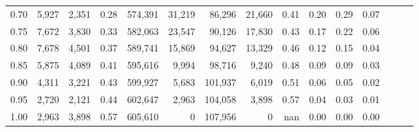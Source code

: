 \begin{tabular}{rrrrrrrrrrrrrrr}
0.70 &    5,927 &   2,351 &  0.28 &  574,391 &   31,219 &   86,296 &   21,660 &  0.41 &  0.20 &  0.29 &      0.07 \\
0.75 &    7,672 &   3,830 &  0.33 &  582,063 &   23,547 &   90,126 &   17,830 &  0.43 &  0.17 &  0.22 &      0.06 \\
0.80 &    7,678 &   4,501 &  0.37 &  589,741 &   15,869 &   94,627 &   13,329 &  0.46 &  0.12 &  0.15 &      0.04 \\
0.85 &    5,875 &   4,089 &  0.41 &  595,616 &    9,994 &   98,716 &    9,240 &  0.48 &  0.09 &  0.09 &      0.03 \\
0.90 &    4,311 &   3,221 &  0.43 &  599,927 &    5,683 &  101,937 &    6,019 &  0.51 &  0.06 &  0.05 &      0.02 \\
0.95 &    2,720 &   2,121 &  0.44 &  602,647 &    2,963 &  104,058 &    3,898 &  0.57 &  0.04 &  0.03 &      0.01 \\
1.00 &    2,963 &   3,898 &  0.57 &  605,610 &        0 &  107,956 &        0 &   nan &  0.00 &  0.00 &      0.00 \\
\bottomrule
\end{tabular}
